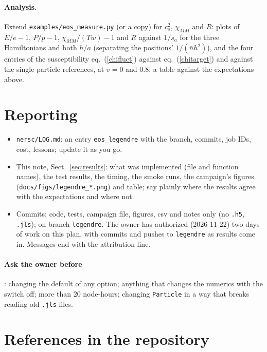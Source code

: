 \documentclass[11pt,aps,preprint,nofootinbib,superscriptaddress,tightenlines]{revtex4-2}
\def\Eq#1{eq.~(\ref{#1})}
\def\Sect#1{Sect.~\ref{#1}}
\let\oldparagraph\paragraph
\renewcommand{\paragraph}{\par\bigskip\oldparagraph}
\begin{document}
\paragraph{Analysis.}  Extend \nolinkurl{examples/eos_measure.py} (or a copy) for $c_s^2$, $\chi_{MM}$ and $R$: plots of $E/e-1$, $P/p-1$, $\chi_{MM}/(Tw)-1$
and $R$ against $1/s_a$ for the three Hamiltonians and both $h/a$ (separating the positions' $1/(\bar nh^2)$), and the four entries of the susceptibility \Eq{chifluct} against \Eq{chitarget} and against the single-particle references, at $v=0$ and $0.8$; a table
against the expectations above.

\section{Reporting}
\label{sec:report}

\begin{itemize}
\item \nolinkurl{nersc/LOG.md}: an entry \texttt{eos\_legendre} with the branch, commits, job IDs, cost, lessons; update it as you go.
\item This note, \Sect{sec:results}: what was implemented (file and function names), the test results, the timing, the smoke runs, the campaign's figures
  (\nolinkurl{docs/figs/legendre_*.png}) and table; say plainly where the results agree with the expectations and where not.
\item Commits: code, tests, campaign file, figures, csv and notes only (no \texttt{.h5}, \texttt{.jls}); on branch \texttt{legendre}.  The owner has
  authorized (2026-11-22) two days of work on this plan, with commits and pushes to \texttt{legendre} as results come in.  Messages end with the attribution
  line.
\end{itemize}

\paragraph{Ask the owner before}: changing the default of any option; anything that changes the numerics with the switch off; more than 20 node-hours;
changing \texttt{Particle} in a way that breaks reading old \texttt{.jls} files.

\section{References in the repository}
\label{sec:refs}
\end{document}
